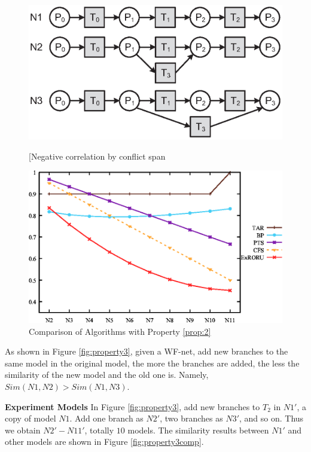 \documentclass{llncs}
\begin{document}
\begin{figure}[ht]
\centering
\begin{minipage}[t]{0.45\textwidth}
	\centering
	\includegraphics[width=1\textwidth]{fig_property_2.eps}
	\caption{[Negative correlation by conflict span}
	\label{fig:property2}
\end{minipage}
\hspace{0.1in}
\begin{minipage}[t]{0.45\textwidth}
	\centering
	\includegraphics[width=1\textwidth]{fig_property_2_comp.eps}
	\caption{Comparison of Algorithms with Property \ref{prop:2}}
	\label{fig:property2comp}
\end{minipage}
\end{figure}

\begin{property}\label{prop:3}
As shown in Figure \ref{fig:property3}, given a WF-net, add new branches to the same model in the original model, the more the branches are added, the less the similarity of the new model and the old one is. Namely, $Sim(N1,N2)>Sim(N1,N3)$.
\end{property}
\textbf{Experiment Models} In Figure \ref{fig:property3}, add new branches to $T_{2}$ in $N1'$, a copy of model $N1$. Add one branch as $N2'$, two branches as $N3'$, and so on. Thus we obtain $N2'-N11'$, totally $10$ models. The similarity results between $N1'$ and other models are shown in Figure \ref{fig:property3comp}.
\end{document}
